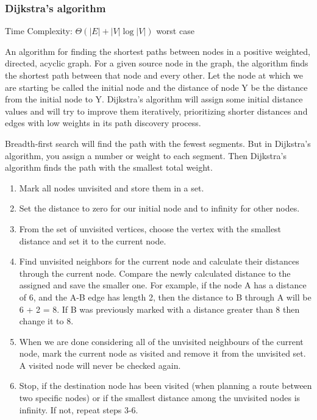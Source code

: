 \documentclass{article}
\begin{document}
    \subsubsection{Dijkstra's algorithm}
    Time Complexity: $\Theta (|E|+|V|\log |V|)$ worst case
    
    An algorithm for finding the shortest paths between nodes in a positive weighted, directed, acyclic graph. For a given source node in the graph, the algorithm finds the shortest path between that node and every other. Let the node at which we are starting be called the initial node and the distance of node Y be the distance from the initial node to Y. Dijkstra's algorithm will assign some initial distance values and will try to improve them iteratively, prioritizing shorter distances and edges with low weights in its path discovery process.
    
    Breadth-first search will find the path with the fewest segments. But in Dijkstra’s algorithm, you assign a number or weight to each segment. Then Dijkstra’s algorithm finds the path with the smallest total weight.
    
    \begin{enumerate}
        \item Mark all nodes unvisited and store them in a set.
        
        \item Set the distance to zero for our initial node and to infinity for other nodes.

        \item From the set of unvisited vertices, choose the vertex with the smallest distance and set it to the current node.
        
        \item Find unvisited neighbors for the current node and calculate their distances through the current node. Compare the newly calculated distance to the assigned and save the smaller one. 
        For example, if the node A has a distance of 6, and the A-B edge has length 2, then the distance to B through A will be 6 + 2 = 8. If B was previously marked with a distance greater than 8 then change it to 8.

        \item When we are done considering all of the unvisited neighbours of the current node, mark the current node as visited and remove it from the unvisited set. A visited node will never be checked again.
        
        \item Stop, if the destination node has been visited (when planning a route between two specific nodes) or if the smallest distance among the unvisited nodes is infinity. If not, repeat steps 3-6.
    \end{enumerate}
    
\end{document}
